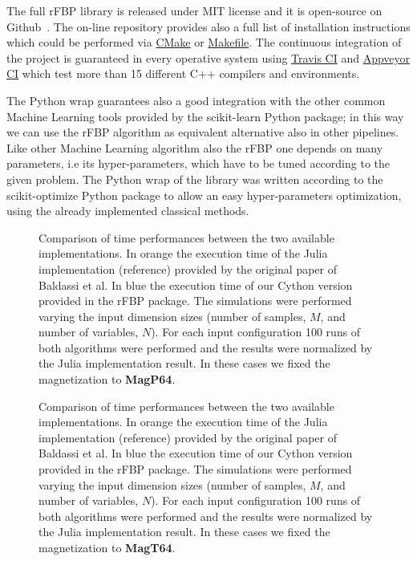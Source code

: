 \documentclass{standalone}
\begin{document}
The full \textsf{rFBP} library is released under MIT license and it is open-source on Github~\cite{ReplicatedFocusingBeliefPropagation}.
The on-line repository provides also a full list of installation instructions which could be performed via \href{https://github.com/Nico-Curti/rFBP/blob/master/CMakeLists.txt}{\textsf{CMake}} or \href{https://github.com/Nico-Curti/rFBP/blob/master/Makefile}{\textsf{Makefile}}.
The continuous integration of the project is guaranteed in every operative system using \href{https://github.com/Nico-Curti/rFBP/blob/master/.travis.yml}{\textsf{Travis CI}} and \href{https://github.com/Nico-Curti/rFBP/blob/master/appveyor.yml}{\textsf{Appveyor CI}} which test more than 15 different \textsf{C++} compilers and environments.

The \textsf{Python} wrap guarantees also a good integration with the other common Machine Learning tools provided by the \textsf{scikit-learn} \textsf{Python} package; in this way we can use the \textsf{rFBP} algorithm as equivalent alternative also in other pipelines.
Like other Machine Learning algorithm also the \textsf{rFBP} one depends on many parameters, i.e its hyper-parameters, which have to be tuned according to the given problem.
The \textsf{Python} wrap of the library was written according to the \textsf{scikit-optimize} \textsf{Python} package to allow an easy hyper-parameters optimization, using the already implemented classical methods.

\begin{figure}[htbp]
\centering
\def\svgwidth{0.85\textwidth}

\caption{Comparison of time performances between the two available implementations.
In orange the execution time of the \textsf{Julia} implementation (reference) provided by the original paper of Baldassi et al.
In blue the execution time of our \textsf{Cython} version provided in the \textsf{rFBP} package.
The simulations were performed varying the input dimension sizes (number of samples, $M$, and number of variables, $N$).
For each input configuration 100 runs of both algorithms were performed and the results were normalized by the \textsf{Julia} implementation result.
In these cases we fixed the magnetization to \textbf{MagP64}.
}
\label{fig:rfbp_magp}
\end{figure}

\begin{figure}[htbp]
\centering
\def\svgwidth{0.85\textwidth}

\caption{Comparison of time performances between the two available implementations.
In orange the execution time of the \textsf{Julia} implementation (reference) provided by the original paper of Baldassi et al.
In blue the execution time of our \textsf{Cython} version provided in the \textsf{rFBP} package.
The simulations were performed varying the input dimension sizes (number of samples, $M$, and number of variables, $N$).
For each input configuration 100 runs of both algorithms were performed and the results were normalized by the \textsf{Julia} implementation result.
In these cases we fixed the magnetization to \textbf{MagT64}.
}
\label{fig:rfbp_magt}
\end{figure}
\end{document}
